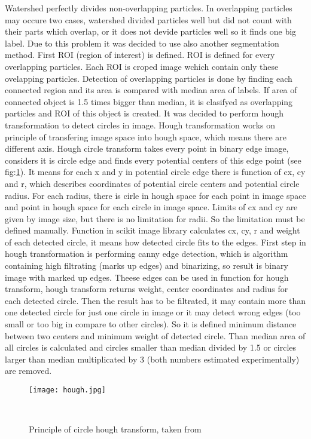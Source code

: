Watershed perfectly divides non-overlapping particles. In overlapping particles may occure
two cases, watershed divided particles well but did not count with their parts which
overlap, or it does not devide particles well so it finds one big label. Due to this
problem it was decided to use also another segmentation method. First ROI (region of
interest) is defined. ROI is defined for every overlapping particles. Each ROI is
croped image wchich contain only these ovelapping particles. Detection of overlapping
particles is done by finding each connected region and its area is compared with
median area of labels. If area of connected object is 1.5 times bigger than median,
it is clasifyed as overlapping particles and ROI of this object is created.
It was decided to perform hough transformation to detect circles in image. Hough
transformation works on principle of transfering image space into hough space, which means
there are different axis. Hough circle transform takes every point in binary edge image,
considers it is circle edge and finds every potential centers of this edge point (see fig:\ref{fig:hough}).
It means for each x and y in potential circle edge there is function of cx, cy and r,
which describes coordinates of potential circle centers and potential circle radius.
For each radius, there is cirle in hough space for each point in image space and
point in hough space for each circle in image space. Limits of cx and cy are given by
image size, but there is no limitation for radii. So the limitation must be defined
manually. Function in scikit image library calculates cx, cy, r and weight of each
detected circle, it means how detected circle fits to the edges. First step in hough
transformation is performing canny edge detection, which is algorithm containing
high filtrating (marks up edges) and binarizing, so result is binary image with marked
up edges. Theese edges can be used in function for hough transform, hough transform
returns weight, center coordinates and radius for each detected circle. Then the result
has to be filtrated, it may contain more than one detected circle for just one circle in
image or it may detect wrong edges (too small or too big in compare to other circles).
So it is defined minimum distance between two centers and minimum weight of detected circle.
Than median area of all circles is calculated and circles smaller than median divided by
1.5 or circles larger than median multiplicated by 3 (both numbers estimated experimentally)
are removed. \cite{skimage}

\begin{figure}[h]
    \texttt{[image: hough.jpg]}
    \caption{Principle of circle hough transform, taken from~\cite{20}}~\label{fig:hough}
\end{figure}


